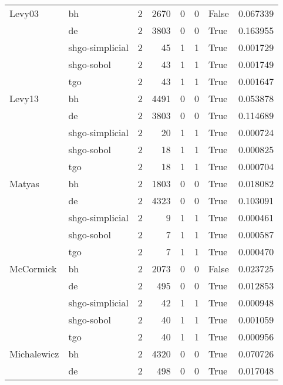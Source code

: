 \begin{longtable}{llrrrrlr}
Levy03 & bh &     2 &     2670 &      0 &       0 &   False &    0.067339 \\
         & de &     2 &     3803 &      0 &       0 &    True &    0.163955 \\
         & shgo-simplicial &     2 &       45 &      1 &       1 &    True &    0.001729 \\
         & shgo-sobol &     2 &       43 &      1 &       1 &    True &    0.001749 \\
         & tgo &     2 &       43 &      1 &       1 &    True &    0.001647 \\
Levy13 & bh &     2 &     4491 &      0 &       0 &    True &    0.053878 \\
         & de &     2 &     3803 &      0 &       0 &    True &    0.114689 \\
         & shgo-simplicial &     2 &       20 &      1 &       1 &    True &    0.000724 \\
         & shgo-sobol &     2 &       18 &      1 &       1 &    True &    0.000825 \\
         & tgo &     2 &       18 &      1 &       1 &    True &    0.000704 \\
Matyas & bh &     2 &     1803 &      0 &       0 &    True &    0.018082 \\
         & de &     2 &     4323 &      0 &       0 &    True &    0.103091 \\
         & shgo-simplicial &     2 &        9 &      1 &       1 &    True &    0.000461 \\
         & shgo-sobol &     2 &        7 &      1 &       1 &    True &    0.000587 \\
         & tgo &     2 &        7 &      1 &       1 &    True &    0.000470 \\
McCormick & bh &     2 &     2073 &      0 &       0 &   False &    0.023725 \\
         & de &     2 &      495 &      0 &       0 &    True &    0.012853 \\
         & shgo-simplicial &     2 &       42 &      1 &       1 &    True &    0.000948 \\
         & shgo-sobol &     2 &       40 &      1 &       1 &    True &    0.001059 \\
         & tgo &     2 &       40 &      1 &       1 &    True &    0.000956 \\
Michalewicz & bh &     2 &     4320 &      0 &       0 &    True &    0.070726 \\
         & de &     2 &      498 &      0 &       0 &    True &    0.017048 \\

\end{longtable}

